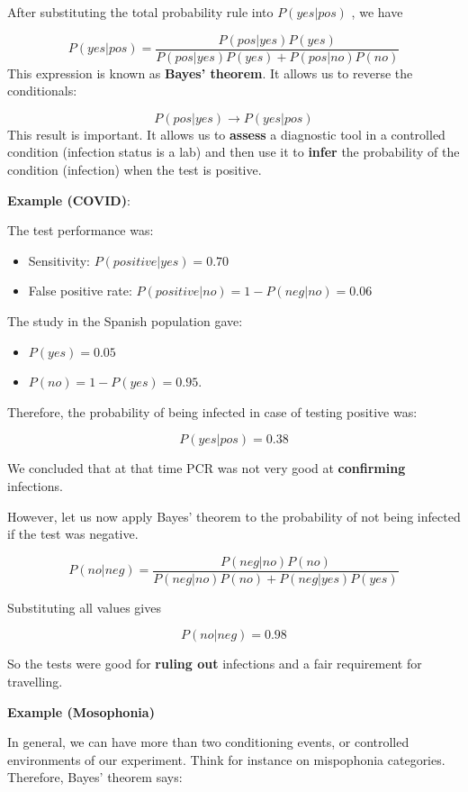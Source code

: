 \documentclass[
]{book}
\providecommand{\tightlist}{%
  \setlength{\itemsep}{0pt}\setlength{\parskip}{0pt}}
\begin{document}
After substituting the total probability rule into \(P(yes| pos)\) , we have

\[P(yes| pos)= \frac{P(pos|yes)P(yes)}{P(pos|yes)P(yes)+P(pos|no)P(no)}\]
This expression is known as \textbf{Bayes' theorem}. It allows us to reverse the conditionals:

\[P(pos|yes) \rightarrow P(yes| pos)\]
This result is important. It allows us to \textbf{assess} a diagnostic tool in a controlled condition (infection status is a lab) and then use it to \textbf{infer} the probability of the condition (infection) when the test is positive.

\textbf{Example (COVID)}:

The test performance was:

\begin{itemize}
\item
  Sensitivity: \(P(positive| yes)= 0.70\)
\item
  False positive rate: \(P(positive| no)= 1- P(neg|no)=0.06\)
\end{itemize}

The study in the Spanish population gave:

\begin{itemize}
\tightlist
\item
  \(P(yes)=0.05\)
\item
  \(P(no)=1-P(yes)=0.95\).
\end{itemize}

Therefore, the probability of being infected in case of testing positive was:

\[P(yes| pos)= 0.38\]

We concluded that at that time PCR was not very good at \textbf{confirming} infections.

However, let us now apply Bayes' theorem to the probability of not being infected if the test was negative.

\[P(no|neg) = \frac{P(neg|no) P(no )}{ P(neg|no) P(no)+P(neg|yes)P(yes)}\]

Substituting all values gives

\[P(no| neg)= 0.98\]

So the tests were good for \textbf{ruling out} infections and a fair requirement for travelling.

\textbf{Example (Mosophonia)}

In general, we can have more than two conditioning events, or controlled environments of our experiment. Think for instance on mispophonia categories. Therefore, Bayes' theorem says:
\end{document}
